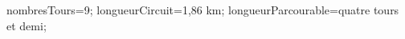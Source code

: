 \documentclass[exercice]{thedocument}%
\begin{document}
%
\>nombresTours=9;%
\>longueurCircuit=1,86 km;%
\>longueurParcourable=quatre tours et demi;%
%
\end{document}
